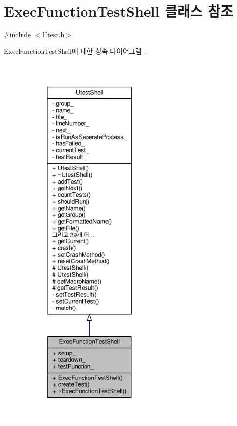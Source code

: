 \hypertarget{class_exec_function_test_shell}{}\section{Exec\+Function\+Test\+Shell 클래스 참조}
\label{class_exec_function_test_shell}


{\ttfamily \#include $<$Utest.\+h$>$}



Exec\+Function\+Test\+Shell에 대한 상속 다이어그램 \+: 
\nopagebreak
\begin{figure}[H]
\begin{center}
\leavevmode
\includegraphics[height=550pt]{class_exec_function_test_shell__inherit__graph}
\end{center}
\end{figure}


